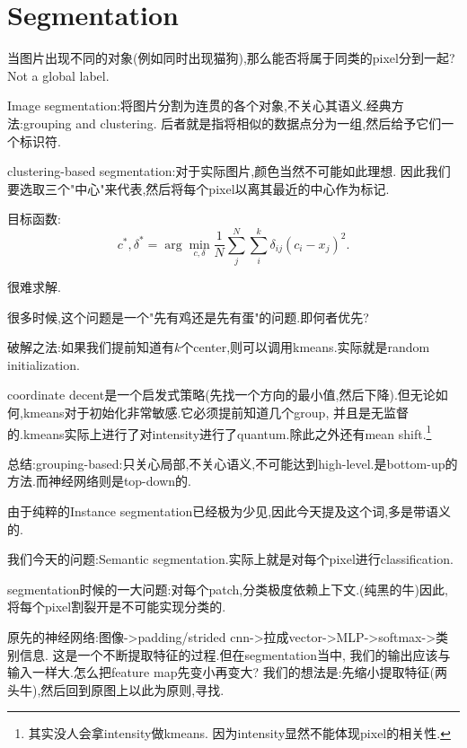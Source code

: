 \chapter{Segmentation}

当图片出现不同的对象(例如同时出现猫狗),那么能否将属于同类的pixel分到一起?Not a global label.

Image segmentation:将图片分割为连贯的各个对象,不关心其语义.经典方法:grouping and clustering.
后者就是指将相似的数据点分为一组,然后给予它们一个标识符.

clustering-based segmentation:对于实际图片,颜色当然不可能如此理想.
因此我们要选取三个"中心"来代表,然后将每个pixel以离其最近的中心作为标记.

目标函数:
\begin{equation}
	c^*, \delta^* = \arg \min_{c, \delta} \frac{1}{N} \sum_{j}^{N} \sum_{i}^{k} \delta_{ij} (c_i - x_j)^2.
\end{equation}

很难求解.

很多时候,这个问题是一个"先有鸡还是先有蛋"的问题.即何者优先?

破解之法:如果我们提前知道有$k$个center,则可以调用kmeans.实际就是random initialization.

coordinate decent是一个启发式策略(先找一个方向的最小值,然后下降).但无论如何,kmeans对于初始化非常敏感.它必须提前知道几个group,
并且是无监督的.kmeans实际上进行了对intensity进行了quantum.除此之外还有mean shift.\footnote{其实没人会拿intensity做kmeans.
因为intensity显然不能体现pixel的相关性.}

总结:grouping-based:只关心局部,不关心语义,不可能达到high-level.是bottom-up的方法.而神经网络则是top-down的.

由于纯粹的Instance segmentation已经极为少见,因此今天提及这个词,多是带语义的.

我们今天的问题:Semantic segmentation.实际上就是对每个pixel进行classification.

segmentation时候的一大问题:对每个patch,分类极度依赖上下文.(纯黑的牛)因此,将每个pixel割裂开是不可能实现分类的.

原先的神经网络:图像->padding/strided cnn->拉成vector->MLP->softmax->类别信息.
这是一个不断提取特征的过程.但在segmentation当中,
我们的输出应该与输入一样大.怎么把feature map先变小再变大?
我们的想法是:先缩小提取特征(两头牛),然后回到原图上以此为原则,寻找.

